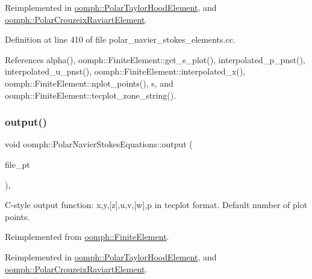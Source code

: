 Reimplemented in \hyperlink{classoomph_1_1PolarTaylorHoodElement_acca69fdd471868d493ec2087f81a7188}{oomph\+::\+Polar\+Taylor\+Hood\+Element}, and \hyperlink{classoomph_1_1PolarCrouzeixRaviartElement_ac170ddb5c2a7047d46a20d8c41da22df}{oomph\+::\+Polar\+Crouzeix\+Raviart\+Element}.



Definition at line 410 of file polar\+\_\+navier\+\_\+stokes\+\_\+elements.\+cc.



References alpha(), oomph\+::\+Finite\+Element\+::get\+\_\+s\+\_\+plot(), interpolated\+\_\+p\+\_\+pnst(), interpolated\+\_\+u\+\_\+pnst(), oomph\+::\+Finite\+Element\+::interpolated\+\_\+x(), oomph\+::\+Finite\+Element\+::nplot\+\_\+points(), s, and oomph\+::\+Finite\+Element\+::tecplot\+\_\+zone\+\_\+string().

\mbox{\label{classoomph_1_1PolarNavierStokesEquations_aad582ad191d1dd67ee148495ee46778e}} 
\subsubsection{\texorpdfstring{output()}{output()}\hspace{0.1cm}{\footnotesize\ttfamily [3/4]}}
{\footnotesize\ttfamily void oomph\+::\+Polar\+Navier\+Stokes\+Equations\+::output (\begin{DoxyParamCaption}\item[{F\+I\+LE $\ast$}]{file\+\_\+pt }\end{DoxyParamCaption})\hspace{0.3cm}{\ttfamily [inline]}, {\ttfamily [virtual]}}



C-\/style output function\+: x,y,\mbox{[}z\mbox{]},u,v,\mbox{[}w\mbox{]},p in tecplot format. Default number of plot points. 



Reimplemented from \hyperlink{classoomph_1_1FiniteElement_a72cddd09f8ddbee1a20a1ff404c6943e}{oomph\+::\+Finite\+Element}.



Reimplemented in \hyperlink{classoomph_1_1PolarTaylorHoodElement_ab1d58fc5d344421bdf29ea11514accb6}{oomph\+::\+Polar\+Taylor\+Hood\+Element}, and \hyperlink{classoomph_1_1PolarCrouzeixRaviartElement_a3ebab0f1e7981aaab9100fcaa39cd7a4}{oomph\+::\+Polar\+Crouzeix\+Raviart\+Element}.



